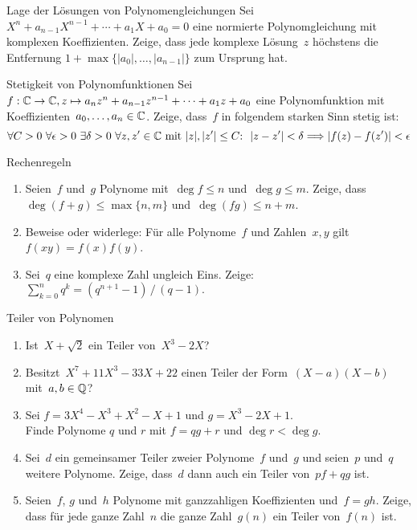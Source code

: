 \documentclass{algblatt}
\begin{document}
\vspace*{-1.5cm}

\begin{aufgabe}{Lage der Lösungen von Polynomengleichungen}
Sei $X^n + a_{n - 1} X^{n - 1} + \cdots + a_1 X + a_0 = 0$ eine normierte
Polynomgleichung mit komplexen Koeffizienten. Zeige, dass jede komplexe
Lösung~$z$ höchstens die Entfernung
$1+\max\{|a_0|,\ldots,|a_{n-1}|\}$ zum Ursprung hat.
\end{aufgabe}

\begin{aufgabe}{Stetigkeit von Polynomfunktionen}
Sei~$f:\mathbb{C}\to\mathbb{C}, z \mapsto a_nz^n + a_{n-1}z^{n-1} + \cdots + a_1z + a_0$ eine
Polynomfunktion mit Koeffizienten~$a_0,\ldots,a_n \in \mathbb{C}$. Zeige, dass~$f$ in
folgendem starken Sinn stetig ist:
\[
  \forall C > 0\ 
  \forall \epsilon > 0\ 
  \exists \delta > 0 \ 
  \forall \text{$z,z' \in \CC$ mit $|z|,|z'| \leq C$}{:}\ \ 
  |z-z'| < \delta \Longrightarrow |f(z) - f(z')| < \epsilon
\]
\vspace{-2.0em}
\end{aufgabe}

\begin{aufgabe}{Rechenregeln}
\begin{enumerate}
\item Seien~$f$ und~$g$ Polynome mit~$\deg f \leq n$ und~$\deg g \leq m$.
Zeige, dass $\deg(f+g) \leq \max\{n,m\}$ und~$\deg(fg) \leq n+m$.
\item Beweise oder widerlege: Für alle Polynome~$f$ und Zahlen~$x,y$ gilt~$f(xy) = f(x) f(y)$.
\item Sei~$q$ eine komplexe Zahl ungleich Eins. Zeige: $\sum_{k=0}^n q^k =
(q^{n+1}-1)\,/\,(q-1).$
\end{enumerate}
\end{aufgabe}

\begin{aufgabe}{Teiler von Polynomen}
\begin{enumerate}
\item Ist~$X+\sqrt{2}$ ein Teiler von~$X^3-2X$?
\item Besitzt~$X^7 + 11 X^3 - 33 X + 22$ einen Teiler der
Form~$(X-a)(X-b)$ mit~$a,b \in \mathbb{Q}$?
\item Sei $f = 3 X^4 - X^3 + X^2 - X + 1$ und $g = X^3 - 2 X + 1$. \\
Finde Polynome $q$ und $r$ mit $f = q g + r$ und
$\deg r < \deg g$.
\item Sei~$d$ ein gemeinsamer Teiler zweier Polynome~$f$ und~$g$ und seien~$p$
und~$q$ weitere Polynome.
Zeige, dass~$d$ dann auch ein Teiler von~$pf + qg$ ist.
\item Seien~$f$, $g$ und~$h$ Polynome mit ganzzahligen Koeffizienten und~$f =
gh$. Zeige, dass für jede ganze Zahl~$n$ die ganze Zahl~$g(n)$ ein Teiler
von~$f(n)$ ist.
\end{enumerate}
\end{aufgabe}
\end{document}
